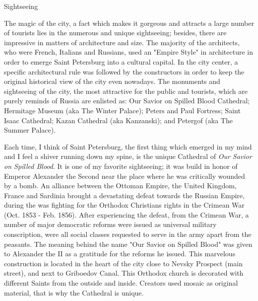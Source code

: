 \documentclass[10pt,a4paper]{article} %
\newcommand{\NewsItem}[1]{ %
\usefont{T1}{fvs}{n}{n} %
\vspace{24pt}\large #1\vspace{3pt} %
\par \normalsize \normalfont}
\begin{document}
\begin{multicols}{3} %


\NewsItem{Sightseeing}

The magic of the city, a fact which makes it gorgeous and attracts 
a large number of tourists lies in the numerous and unique sightseeing; 
besides, there are impressive in matters of architecture and size. 
The majority of the architects, who were French, Italians and Russians, 
used an "Empire Style" in architecture in order to emerge Saint Petersburg 
into a cultural capital. 
In the city center, a specific architectural rule was followed 
by the constructors in order to keep the original historical view of the city even nowadays. 
The monuments and sightseeing of the city, the most attractive for the public and tourists, 
which are purely reminds of Russia are enlisted as: Our Savior on Spilled Blood Cathedral; 
Hermitage Museum (aka The Winter Palace); Peters and Paul Fortress; Saint Isaac Cathedral; 
Kazan Cathedral (aka Kanzanski); and Petergof (aka The Summer Palace).

Each time, I think of Saint Petersburg, the first thing which emerged in my mind and 
I feel a shiver running down my spine, is the unique Cathedral 
of \textit{Our Savior on Spilled Blood}. 
It is one of my favorite sightseeing; it was build in honor of Emperor Alexander 
the Second near the place where he was critically wounded by a bomb. 
An alliance between the Ottoman Empire, the United Kingdom, 
France and Sardinia brought a devastating defeat towards the Russian Empire, 
during the was fighting for the Orthodox Christians rights in the Crimean War 
(Oct. 1853 - Feb. 1856). 
After experiencing the defeat, from the Crimean War, 
a number of major democratic reforms were issued as universal military conscription, 
were all social classes requested to serve in the army apart from the peasants. 
The meaning behind the name "Our Savior on Spilled Blood" was given to 
Alexander the II as a gratitude for the reforms he issued. 
This marvelous construction is located in the heart of the city close 
to Nevsky Prospect (main street), and next to Griboedov Canal. 
This Orthodox church is decorated with different Saints from the outside and inside. 
Creators used mosaic as original material, that is why the Cathedral is unique.


\end{multicols}
\end{document}
